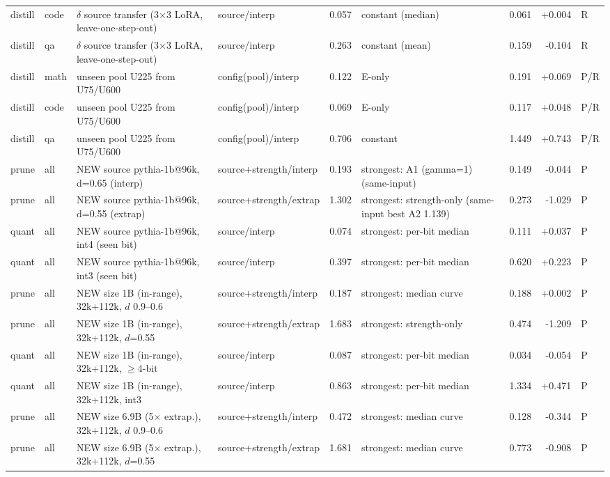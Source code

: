 \begin{table}
\begin{tabular}{@{}llp{4.6cm}lrp{3.2cm}rrl@{}}
distill & code & $\delta$ source transfer (3$\times$3 LoRA, leave-one-step-out) & source/interp & 0.057 & constant (median) & 0.061 & +0.004 & R \\
distill & qa & $\delta$ source transfer (3$\times$3 LoRA, leave-one-step-out) & source/interp & 0.263 & constant (mean) & 0.159 & -0.104 & R \\
distill & math & unseen pool U225 from U75/U600 & config(pool)/interp & 0.122 & E-only & 0.191 & +0.069 & P/R \\
distill & code & unseen pool U225 from U75/U600 & config(pool)/interp & 0.069 & E-only & 0.117 & +0.048 & P/R \\
distill & qa & unseen pool U225 from U75/U600 & config(pool)/interp & 0.706 & constant & 1.449 & +0.743 & P/R \\
\midrule
prune & all & NEW source pythia-1b@96k, d=0.65 (interp) & source+strength/interp & 0.193 & strongest: A1 (gamma=1) (same-input) & 0.149 & -0.044 & P \\
prune & all & NEW source pythia-1b@96k, d=0.55 (extrap) & source+strength/extrap & 1.302 & strongest: strength-only (same-input best A2 1.139) & 0.273 & -1.029 & P \\
\midrule
quant & all & NEW source pythia-1b@96k, int4 (seen bit) & source/interp & 0.074 & strongest: per-bit median & 0.111 & +0.037 & P \\
quant & all & NEW source pythia-1b@96k, int3 (seen bit) & source/interp & 0.397 & strongest: per-bit median & 0.620 & +0.223 & P \\
\midrule
prune & all & NEW size 1B (in-range), 32k+112k, $d$ 0.9--0.6 & source+strength/interp & 0.187 & strongest: median curve & 0.188 & +0.002 & P \\
prune & all & NEW size 1B (in-range), 32k+112k, $d$=0.55 & source+strength/extrap & 1.683 & strongest: strength-only & 0.474 & -1.209 & P \\
\midrule
quant & all & NEW size 1B (in-range), 32k+112k, $\ge$4-bit & source/interp & 0.087 & strongest: per-bit median & 0.034 & -0.054 & P \\
quant & all & NEW size 1B (in-range), 32k+112k, int3 & source/interp & 0.863 & strongest: per-bit median & 1.334 & +0.471 & P \\
\midrule
prune & all & NEW size 6.9B (5$\times$ extrap.), 32k+112k, $d$ 0.9--0.6 & source+strength/interp & 0.472 & strongest: median curve & 0.128 & -0.344 & P \\
prune & all & NEW size 6.9B (5$\times$ extrap.), 32k+112k, $d$=0.55 & source+strength/extrap & 1.681 & strongest: median curve & 0.773 & -0.908 & P \\

\end{tabular}
\end{table}
